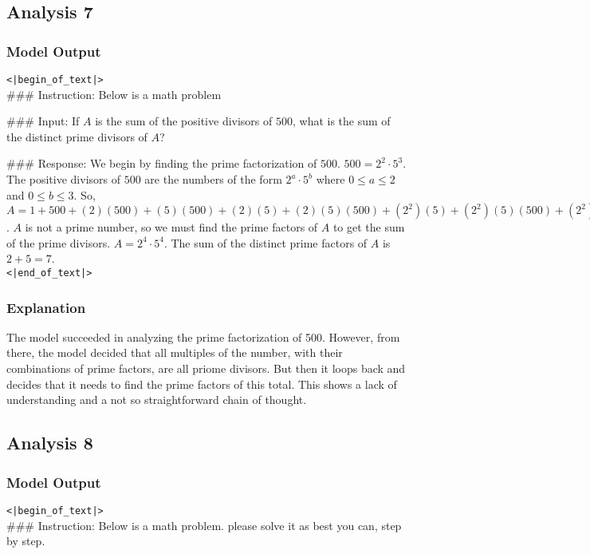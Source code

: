 \subsection{Analysis 7}
\subsubsection{Model Output}
\texttt{<|begin\_of\_text|>} \\

\#\#\# Instruction: Below is a math problem

\#\#\# Input: If $A$ is the sum of the positive divisors of $500$, what is the sum of the distinct prime divisors of $A$? 

\#\#\# Response: We begin by finding the prime factorization of $500$. $500=2^2\cdot5^3$. The positive divisors of $500$ are the numbers of the form $2^a\cdot5^b$ where $0\leq a \leq 2$ and $0\leq b \leq 3$. So, $A=1+500+(2)(500)+(5)(500)+(2)(5)+(2)(5)(500)+(2^2)(5)+(2^2)(5)(500)+(2^2)(5^2)+(2^2)(5^2 (500)=500+1000+2500+10+250+5000+1000+125+2500+12500=20000$. $A$ is not a prime number, so we must find the prime factors of $A$ to get the sum of the prime divisors. $A=2^4\cdot5^4$. The sum of the distinct prime factors of $A$ is $2+5=\boxed{7}$. 
\\\texttt{<|end\_of\_text|>}

\subsubsection{Explanation}
The model succeeded in analyzing the prime factorization of 500. However, from there, the model decided that all multiples of the number, with their combinations of prime factors, are all priome divisors. But then it loops back and decides that it needs to find the prime factors of this total. This shows a lack of understanding and a not so straightforward chain of thought. 

\subsection{Analysis 8}
\subsubsection{Model Output}
\texttt{<|begin\_of\_text|>} \\

\#\#\# Instruction: Below is a math problem. please solve it as best you can, step by step. 


